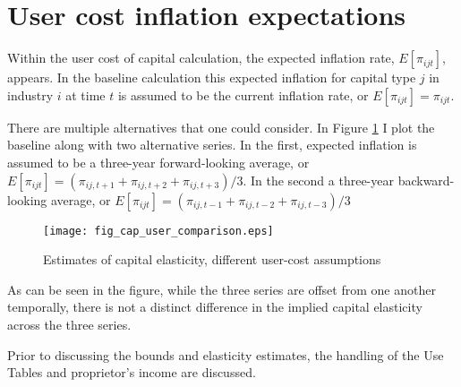 \section{User cost inflation expectations}
Within the user cost of capital calculation, the expected inflation rate, $E[\pi_{ijt}]$, appears. In the baseline calculation this expected inflation for capital type $j$ in industry $i$ at time $t$ is assumed to be the current inflation rate, or $E[\pi_{ijt}] = \pi_{ijt}$. 

There are multiple alternatives that one could consider. In Figure \ref{FIG_cap_user_inflation} I plot the baseline along with two alternative series. In the first, expected inflation is assumed to be a three-year forward-looking average, or $E[\pi_{ijt}] = (\pi_{ij,t+1} + \pi_{ij,t+2} + \pi_{ij,t+3})/3$. In the second a three-year backward-looking average, or $E[\pi_{ijt}] = (\pi_{ij,t-1} + \pi_{ij,t-2} + \pi_{ij,t-3})/3$

\begin{figure}[!htb]
\begin{center}
\caption{Estimates of capital elasticity, different user-cost assumptions}
\label{FIG_cap_user_inflation}
\texttt{[image: fig\_cap\_user\_comparison.eps]}
\end{center}
\vspace{-.5cm}
\end{figure}

As can be seen in the figure, while the three series are offset from one another temporally, there is not a distinct difference in the implied capital elasticity across the three series. 



Prior to discussing the bounds and elasticity estimates, the handling of the Use Tables and proprietor's income are discussed.

